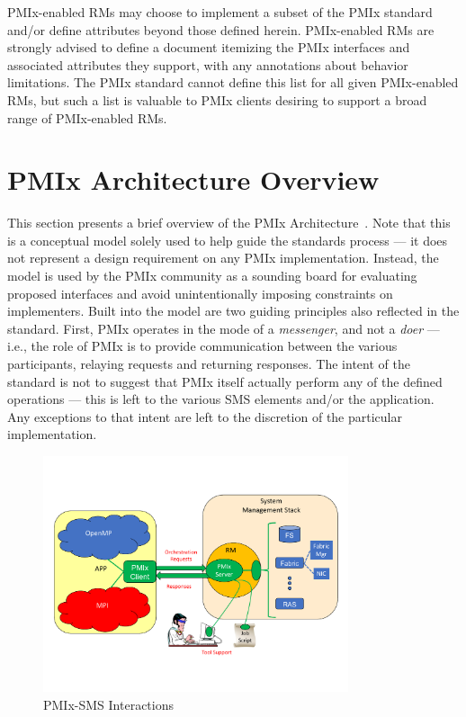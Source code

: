 \ac{PMIx}-enabled \acp{RM} may choose to implement a subset of the \ac{PMIx} standard and/or define attributes beyond those defined herein.
\ac{PMIx}-enabled \acp{RM} are strongly advised to define a document itemizing the \ac{PMIx} interfaces and associated attributes they support, with any annotations about behavior limitations.
The \ac{PMIx} standard cannot define this list for all given \ac{PMIx}-enabled \acp{RM}, but such a list is valuable to \ac{PMIx} clients desiring to support a broad range of \ac{PMIx}-enabled \acp{RM}.



\section{PMIx Architecture Overview}
\label{chap:intro:arch_overview}

This section presents a brief overview of the \ac{PMIx} Architecture~\cite{2017-Castain-EuroMPI}.
Note that this is a conceptual model solely used to help guide the standards process --- it does not represent
a design requirement on any \ac{PMIx} implementation. Instead, the model is used by the
\ac{PMIx} community as a sounding board for evaluating proposed interfaces and avoid unintentionally imposing
constraints on implementers. Built into the model are two guiding principles also reflected in the standard. First,
\ac{PMIx} operates in the mode of a \textit{messenger}, and not a \textit{doer} --- i.e., the role
of \ac{PMIx} is to provide communication between the various participants, relaying requests and returning
responses. The intent of the standard is not to suggest that \ac{PMIx} itself actually perform any of
the defined operations --- this is left to the various \ac{SMS} elements and/or the application. Any exceptions to that intent are left to the discretion of the particular implementation.

\begingroup
\begin{figure}[ht!]
  \begin{center}
    \includegraphics[clip,width=0.8\textwidth]{figs/PMIxRoles.pdf}
  \end{center}
  \caption{PMIx-SMS Interactions}
  \label{fig:roles}
\end{figure}
\endgroup


